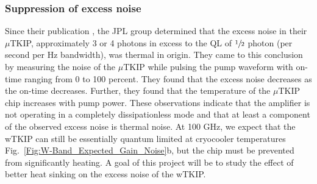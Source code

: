 \subsubsection{Suppression of excess noise}
Since their publication \cite{Eom2012}, the JPL group determined that the excess noise in their $\mu$TKIP, approximately 3 or 4 photons in excess to the QL of $\sfrac{1}{2}$ photon (per second per Hz bandwidth), was thermal in origin. They came to this conclusion by measuring the noise of the $\mu$TKIP while pulsing the pump waveform with on-time ranging from 0 to 100 percent.  They found that the excess noise decreases as the on-time decreases. Further, they found that the temperature of the $\mu$TKIP chip increases with pump power. These observations indicate that the amplifier is not operating in a completely dissipationless mode and that at least a component of the observed excess noise is thermal noise. At 100 GHz, we expect that the wTKIP can still be essentially quantum limited at cryocooler temperatures Fig.~\ref{Fig:W-Band_Expected_Gain_Noise}b, but the chip must be prevented from significantly heating. A goal of this project will be to study the effect of better heat sinking on the excess noise of the wTKIP.






